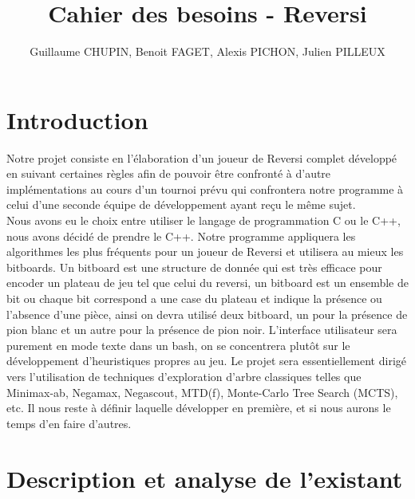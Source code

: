 \documentclass[10pt,a4paper]{article}
\title{Cahier des besoins - Reversi}
\author{Guillaume CHUPIN, Benoit FAGET, Alexis PICHON, Julien PILLEUX}
\begin{document}
\maketitle
\newpage
\tableofcontents
\newpage

\section{Introduction}

Notre projet consiste en l'élaboration d'un joueur de Reversi complet développé en suivant certaines règles afin de pouvoir être confronté à d'autre implémentations au cours d'un tournoi prévu qui confrontera notre programme à celui d'une seconde équipe de développement ayant reçu le même sujet.\\

Nous avons eu le choix entre utiliser le langage de programmation C ou le C++, nous avons décidé de prendre le C++. Notre programme appliquera les algorithmes les plus fréquents pour un joueur de Reversi et utilisera au mieux les bitboards. Un bitboard est une structure de donnée qui est très efficace pour encoder un plateau de jeu tel que celui du reversi, un bitboard est un ensemble de bit ou chaque bit correspond a une case du plateau et indique la présence ou l'absence d'une pièce, ainsi on devra utilisé deux bitboard, un pour la présence de pion blanc et un autre pour la présence de pion noir.  L'interface utilisateur sera purement en mode texte dans un bash, on se concentrera plutôt sur le développement d'heuristiques propres au jeu. Le projet sera essentiellement dirigé vers l'utilisation de techniques d'exploration d'arbre classiques telles que Minimax-ab, Negamax, Negascout, MTD(f), Monte-Carlo Tree Search (MCTS), etc. Il nous reste à définir laquelle développer en première, et si nous aurons le temps d'en faire d'autres.

\section{Description et analyse de l'existant}
\end{document}
